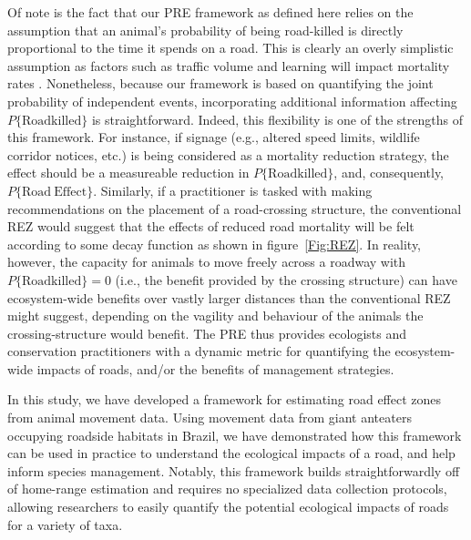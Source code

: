 \documentclass[11pt]{article}
\begin{document}
Of note is the fact that our PRE framework as defined here relies on the assumption that an animal's probability of being road-killed is directly proportional to the time it spends on a road. This is clearly an overly simplistic assumption as factors such as traffic volume and learning will impact mortality rates \citep{Mumme:2000, van:2005, Ford:2007, Noonan:2022b, Ascensao:2022}. Nonetheless, because our framework is based on quantifying the joint probability of independent events, incorporating additional information affecting $P\{\mathrm{Roadkilled}\}$ is straightforward. Indeed, this flexibility is one of the strengths of this framework. For instance, if signage (e.g., altered speed limits, wildlife corridor notices, etc.) is being considered as a mortality reduction strategy, the effect should be a measureable reduction in $P\{\mathrm{Roadkilled}\}$, and, consequently, $P\{\mathrm{Road~Effect}\}$. Similarly, if a practitioner is tasked with making recommendations on the placement of a road-crossing structure, the conventional REZ would suggest that the effects of reduced road mortality will be felt according to some decay function as shown in figure~\ref{Fig:REZ}. In reality, however, the capacity for animals to move freely across a roadway with $P\{\mathrm{Roadkilled}\} = 0$ (i.e., the benefit provided by the crossing structure) can have ecosystem-wide benefits over vastly larger distances than the conventional REZ might suggest, depending on the vagility and behaviour of the animals the crossing-structure would benefit. The PRE thus provides ecologists and conservation practitioners with a dynamic metric for quantifying the ecosystem-wide impacts of roads, and/or the benefits of management strategies.

In this study, we have developed a framework for estimating road effect zones from animal movement data. Using movement data from giant anteaters occupying roadside habitats in Brazil, we have demonstrated how this framework can be used in practice to understand the ecological impacts of a road, and help inform species management. Notably, this framework builds straightforwardly off of home-range estimation and requires no specialized data collection protocols, allowing researchers to easily quantify the potential ecological impacts of roads for a variety of taxa.

\end{document}
